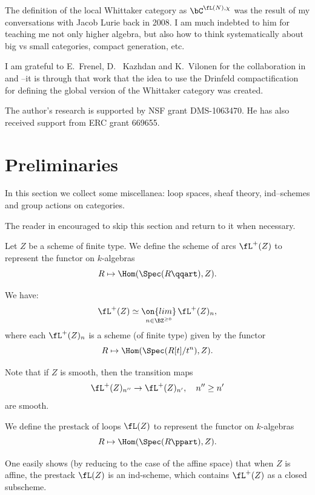 \documentclass[9pt]{amsart}
\theoremstyle{definition}
\theoremstyle{remark}
\numberwithin{equation}{section}
\begin{document}
\medskip

The definition of the local Whittaker category as $\bC^{\fL(N),\chi}$
was the result of my conversations with Jacob Lurie back in 2008. I am much indebted to him
for teaching me not only higher algebra, but also how to think systematically about big vs 
small categories, compact generation, etc. 

\medskip

I am grateful to E.~Frenel, D. ~Kazhdan and K.~Vilonen for the collaboration in \cite{FGKV} and \cite{FGV}--it is through that work
that the idea to use the Drinfeld compactification for defining the global version of the Whittaker category was created. 

\medskip

The author's research is supported by NSF grant DMS-1063470. He has also received support from ERC grant 669655.

\section{Preliminaries}  \label{s:prelim}

In this section we collect some miscellanea: loop spaces, sheaf theory, ind--schemes and group actions 
on categories.

\medskip

The reader in encouraged to skip this section and return to it when necessary. 


\sssec{}

Let $Z$ be a scheme of finite type. We define the scheme of arcs $\fL^+(Z)$ to represent the functor on $k$-algebras
$$R\mapsto \Hom(\Spec(R\qqart),Z).$$

We have:
$$\fL^+(Z)\simeq \underset{n\in \BZ^{\geq 0}}{\on{lim}}\, \fL^+(Z)_n,$$
where each $\fL^+(Z)_n$ is a scheme (of finite type) given by the functor
$$R\mapsto \Hom(\Spec(R[t]/t^n),Z).$$

\medskip

Note that if $Z$ is smooth, then the transition maps
$$\fL^+(Z)_{n''}\to \fL^+(Z)_{n'},\quad n''\geq n'$$
are smooth.

\medskip

We define the prestack of loops $\fL(Z)$ to represent the functor on $k$-algebras
$$R\mapsto \Hom(\Spec(R\ppart),Z).$$

One easily shows (by reducing to the case of the affine space) that when $Z$ is affine, the prestack 
$\fL(Z)$ is an ind-scheme, which contains $\fL^+(Z)$ as a closed subscheme. 
\end{document}
